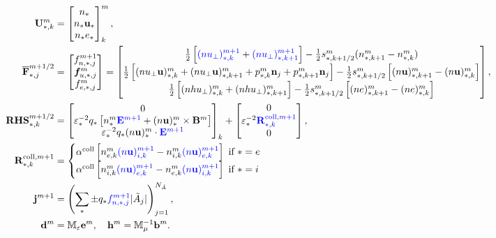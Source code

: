 \documentclass{report}
\begin{document}
\begin{align}
    \mathbf{U}_{*,k}^{m} &=
    \begin{bmatrix}
    n_* \\
    n_* \mathbf{u}_* \\
    n_* e_*
    \end{bmatrix}^m_k, \\
    \overline{\mathbf{F}}_{*,j}^{m+1/2} &=
    \begin{bmatrix}
    f^{m+1}_{n,*,j} \\
    \bm{f}^m_{u,*,j} \\
    f^m_{e,*,j} 
    \end{bmatrix}
    = 
    \begin{bmatrix}
    \frac{1}{2}\left[\textcolor{blue}{(nu_{\bot})_{*,k}^{m+1}} + \textcolor{blue}{(nu_{\bot})_{*,k+1}^{m+1}}\right] - \frac{1}{2}s^m_{*,k+1/2}(n_{*,k+1}^m - n_{*,k}^m) \\
    \frac{1}{2}\left[(nu_{\bot}\mathbf{u})^m_{*,k} + (nu_{\bot}\mathbf{u})^m_{*,k+1} + p_{*,k}^m\mathbf{n}_j + p_{*,k+1}^m\mathbf{n}_j\right] - \frac{1}{2}s^m_{*,k+1/2}\left[(n\mathbf{u})^m_{*,k+1} - (n\mathbf{u})^m_{*,k}\right] \\
    \frac{1}{2}\left[(nhu_\bot)^m_{*,k} + (nhu_\bot)^m_{*,k+1}\right] - \frac{1}{2}s^m_{*,k+1/2}\left[(ne)^m_{*,k+1} - (ne)^m_{*,k}\right]
    \end{bmatrix}, \label{equ:flux_ap}\\
    \mathbf{RHS}_{*,k}^{m+1/2} &=
    \begin{bmatrix}
    0 \\
    \varepsilon_*^{-2}q_*\left[n_*^m\textcolor{blue}{\mathbf{E}^{m+1}} + (n\mathbf{u})^m_*\times\mathbf{B}^m\right] \\
    \varepsilon_*^{-2}q_*(n\mathbf{u})^m_* \cdot \textcolor{blue}{\mathbf{E}^{m+1}}
    \end{bmatrix}_k +
    \begin{bmatrix}
    0 \\
    \varepsilon_*^{-2}\textcolor{blue}{\mathbf{R}_{*,k}^{\text{coll},m+1}} \\
    0
    \end{bmatrix}, \label{equ:rhs_ap}\\
    \mathbf{R}_{*,k}^{\text{coll},m+1} &= 
    \begin{cases}
    \alpha^\text{coll}\left[n_{e,k}^m\textcolor{blue}{(n\mathbf{u})^{m+1}_{i,k}} - n_{i,k}^m\textcolor{blue}{(n\mathbf{u})^{m+1}_{e,k}}\right] \text{  if  } * = e \\
    \alpha^\text{coll}\left[n_{i,k}^m\textcolor{blue}{(n\mathbf{u})^{m+1}_{e,k}} - n_{e,k}^m\textcolor{blue}{(n\mathbf{u})^{m+1}_{i,k}}\right] \text{  if  } * = i
    \end{cases}  \\
    \mathbf{j}^{m+1} &= \left(\sum_*\pm q_*\textcolor{blue}{f^{m+1}_{n,*,j}}|\Tilde{A}_j|\right)_{j=1}^{N_{\Tilde{A}}}, \label{equ:current_ap}\\
    \mathbf{d}^m &= \mathbb{M}_\varepsilon \mathbf{e}^m, \ \ \ \mathbf{h}^m = \mathbb{M}_\mu^{-1} \mathbf{b}^m. \label{equ:material_law}
\end{align}
\end{document}
